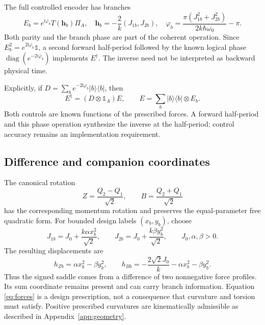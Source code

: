 \documentclass[aip,adv,reprint,onecolumn,amsmath,amssymb]{revtex4-2}
\newcommand{\Id}{\mathbb 1}
\newcommand{\ii}{\mathrm i}
\newcommand{\ket}[1]{\lvert #1\rangle}
\newcommand{\bra}[1]{\langle #1\rvert}
\begin{document}
The full controlled encoder has branches
\begin{equation}
 E_b=e^{\ii\varphi_b}T(\bm h_b)\Pi_A,\quad
 \bm h_b=-\frac2k(J_{1b},J_{2b}),\quad
 \varphi_b=\frac{\pi(J_{1b}^2+J_{2b}^2)}{2k\hbar\omega_0}-\pi.
 \label{eq:complete-encoder}
\end{equation}
Both parity and the branch phase are part of the coherent operation. Since $E_b^2=e^{2\ii\varphi_b}\Id$, a second forward half-period followed by the known logical phase $\operatorname{diag}(e^{-2\ii\varphi_b})$ implements $E^\dagger$. The inverse need not be interpreted as backward physical time.


Explicitly, if $D=\sum_b e^{-2\ii\varphi_b}\ket b\bra b$, then
\begin{equation}
 E^\dagger=(D\otimes\Id_A)E,\qquad E=\sum_b\ket b\bra b\otimes E_b.
 \label{eq:forward-decoder}
\end{equation}
Both controls are known functions of the prescribed forces. A forward half-period and this phase operation synthesize the inverse at the half-period; control accuracy remains an implementation requirement.
\subsection{Difference and companion coordinates}
The canonical rotation
\begin{equation}
 Z=\frac{Q_2-Q_1}{\sqrt2},\qquad B=\frac{Q_2+Q_1}{\sqrt2}
 \label{eq:ZB}
\end{equation}
has the corresponding momentum rotation and preserves the equal-parameter free quadratic form. For bounded design labels $(x_b,y_b)$, choose
\begin{equation}
 J_{1b}=J_0+\frac{k\alpha x_b^2}{\sqrt2},\qquad
 J_{2b}=J_0+\frac{k\beta y_b^2}{\sqrt2},\qquad J_0,\alpha,\beta>0.
 \label{eq:forces}
\end{equation}
The resulting displacements are
\begin{equation}
 h_{Zb}=\alpha x_b^2-\beta y_b^2,\qquad
 h_{Bb}=-\frac{2\sqrt2J_0}k-\alpha x_b^2-\beta y_b^2.
 \label{eq:saddle}
\end{equation}
Thus the signed saddle comes from a difference of two nonnegative force profiles. Its sum coordinate remains present and can carry branch information. Equation \eqref{eq:forces} is a design prescription, not a consequence that curvature and torsion must satisfy. Positive prescribed curvatures are kinematically admissible as described in Appendix~\ref{app:geometry}.
\end{document}
